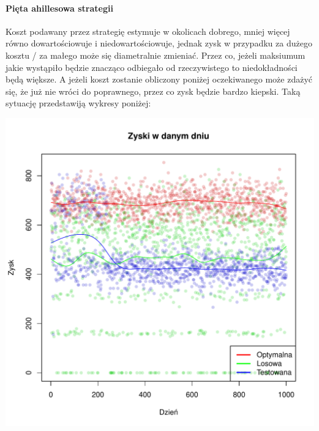 \documentclass{article}
\begin{document}
\paragraph{Pięta ahillesowa strategii}
Koszt podawany przez strategię estymuje w okolicach dobrego, mniej więcej równo dowartościowuje i
niedowartościowuje, jednak zysk w przypadku za dużego kosztu / za małego może się diametralnie zmieniać. Przez co,
jeżeli maksiumum jakie wystąpiło będzie znacząco odbiegało od rzeczywistego to niedokładności będą większe. 
A jeżeli koszt zostanie obliczony poniżej oczekiwanego może zdażyć się, że już nie wróci do poprawnego, przez co zysk będzie bardzo
kiepski. Taką sytuację przedstawiją wykresy poniżej:
\begin{center}
\includegraphics[scale=0.52]{wykresy/problemy/Zysk_strategii_porownanie_koszt_troche_za_maly.pdf}
\end{center}
\end{document}

